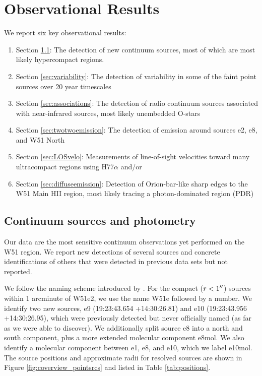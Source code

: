\section{Observational Results}
We report six key observational results: 
\begin{enumerate}
    \item Section \ref{sec:pointsources}: The detection of new continuum
        sources, most of which are most likely hypercompact \hii regions. 
    \item Section \ref{sec:variability}: The detection of variability in
        some of the faint point sources over 20 year timescales
    \item Section \ref{sec:associations}: The detection of radio continuum
        sources associated with near-infrared sources, most likely unembedded
        O-stars
    \item Section \ref{sec:twotwoemission}: The detection of \formaldehyde
        \twotwo emission around sources e2, e8, and W51 North
    \item Section \ref{sec:LOSvelo}: Measurements of line-of-sight velocities
        toward many ultracompact \hii regions using H77$\alpha$ and/or
        \formaldehyde
    \item Section \ref{sec:diffuseemission}: Detection of Orion-bar-like sharp
        edges to the W51 Main HII region, most likely tracing a
        photon-dominated region (PDR)
\end{enumerate}

\subsection{Continuum sources and photometry}
\label{sec:pointsources}
Our data are the most sensitive continuum observations yet performed on the W51
region.  We report new detections of several sources and concrete
identifications of others that were detected in previous data sets but not
reported.

We follow the naming scheme introduced by \citet{Mehringer1994a}.  For the
compact ($r<1\mbox{$^{\prime\prime}$}$) sources within 1 arcminute of W51e2, we use the name
W51e followed by a number.  We identify two new sources, e9 (19:23:43.654
+14:30:26.81) and e10 (19:23:43.956 +14:30:26.95), which were previously
detected but never officially named (as far as we were able to discover).
We additionally split source e8 into a north and south component, plus a more
extended molecular component e8mol.  We also identify a molecular component
between e1, e8, and e10, which we label e10mol.  The source positions
and approximate radii for resolved sources are shown in Figure
\ref{fig:coverview_pointsrcs} and listed in Table \ref{tab:positions}.


